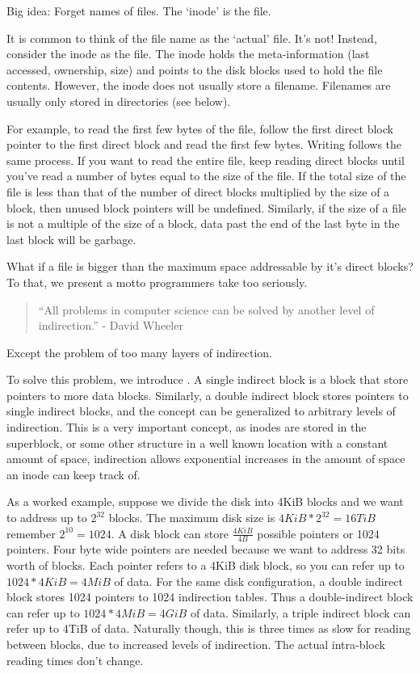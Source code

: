 Big idea: Forget names of files.
The `inode' is the file.

It is common to think of the file name as the `actual' file.
It's not!
Instead, consider the inode as the file.
The inode holds the meta-information (last accessed, ownership, size) and points to the disk blocks used to hold the file contents.
However, the inode does not usually store a filename.
Filenames are usually only stored in directories (see below).

For example, to read the first few bytes of the file, follow the first direct block pointer to the first direct block and read the first few bytes.
Writing follows the same process.
If you want to read the entire file, keep reading direct blocks until you've read a number of bytes equal to the size of the file.
If the total size of the file is less than that of the number of direct blocks multiplied by the size of a block, then unused block pointers will be undefined.
Similarly, if the size of a file is not a multiple of the size of a block, data past the end of the last byte in the last block will be garbage.

What if a file is bigger than the maximum space addressable by it's direct blocks?
To that, we present a motto programmers take too seriously.

\begin{quote}
``All problems in computer science can be solved by another level of indirection.'' - David Wheeler
\end{quote}

Except the problem of too many layers of indirection.

To solve this problem, we introduce .
A single indirect block is a block that store pointers to more data blocks.
Similarly, a double indirect block stores pointers to single indirect blocks, and the concept can be generalized to arbitrary levels of indirection.
This is a very important concept, as inodes are stored in the superblock, or some other structure in a well known location with a constant amount of space, indirection allows exponential increases in the amount of space an inode can keep track of.

As a worked example, suppose we divide the disk into 4KiB blocks and we want to address up to $2^{32}$ blocks.
The maximum disk size is $4KiB *2^{32} = 16TiB$ remember $2^{10} = 1024$.
A disk block can store $\frac{4KiB}{4B}$ possible pointers or 1024 pointers.
Four byte wide pointers are needed because we want to address 32 bits worth of blocks.
Each pointer refers to a 4KiB disk block, so you can refer up to $1024*4KiB = 4MiB$ of data.
For the same disk configuration, a double indirect block stores 1024 pointers to 1024 indirection tables.
Thus a double-indirect block can refer up to $1024 * 4MiB = 4GiB$ of data.
Similarly, a triple indirect block can refer up to 4TiB of data.
Naturally though, this is three times as slow for reading between blocks, due to increased levels of indirection.
The actual intra-block reading times don't change.

